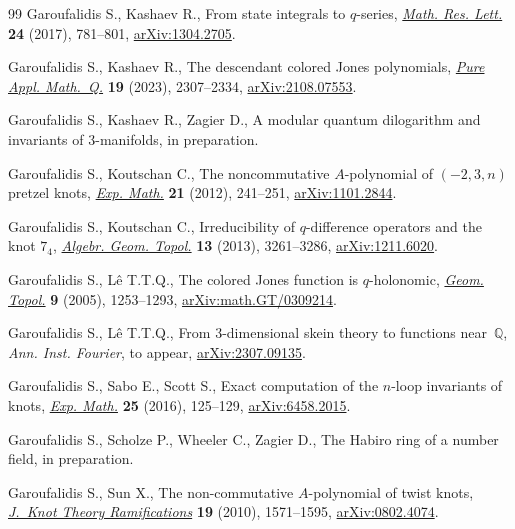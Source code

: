 \documentclass[pdftex]{sigma}
\numberwithin{equation}{section}
\begin{document}
\begin{thebibliography}{99}
Garoufalidis S., Kashaev R., From state integrals to {$q$}-series,
 \href{https://doi.org/10.4310/MRL.2017.v24.n3.a8}{\textit{Math. Res. Lett.}} \textbf{24} (2017), 781--801, \href{https://arxiv.org/abs/1304.2705}{arXiv:1304.2705}.

Garoufalidis S., Kashaev R., The descendant colored {J}ones polynomials,
 \href{https://doi.org/10.4310/PAMQ.2023.v19.n5.a2}{\textit{Pure Appl. Math.~Q.}} \textbf{19} (2023), 2307--2334,
 \href{https://arxiv.org/abs/2108.07553}{arXiv:2108.07553}.

Garoufalidis S., Kashaev R., Zagier D., A modular quantum dilogarithm and
 invariants of {3}-manifolds, in preparation.

Garoufalidis S., Koutschan C., The noncommutative {$A$}-polynomial of
 {$(-2,3,n)$} pretzel knots, \href{https://doi.org/10.1080/10586458.2012.651409}{\textit{Exp. Math.}} \textbf{21} (2012), 241--251,
 \href{https://arxiv.org/abs/1101.2844}{arXiv:1101.2844}.

Garoufalidis S., Koutschan C., Irreducibility of {$q$}-difference operators and
 the knot {$7_4$}, \href{https://doi.org/10.2140/agt.2013.13.3261}{\textit{Algebr. Geom. Topol.}} \textbf{13} (2013),
 3261--3286, \href{https://arxiv.org/abs/1211.6020}{arXiv:1211.6020}.

Garoufalidis S., L\^e T.T.Q., The colored {J}ones function is {$q$}-holonomic,
 \href{https://doi.org/10.2140/gt.2005.9.1253}{\textit{Geom. Topol.}} \textbf{9} (2005), 1253--1293,
 \href{https://arxiv.org/abs/math.GT/0309214}{arXiv:math.GT/0309214}.

Garoufalidis S., L\^e T.T.Q., From 3-dimensional skein theory to functions
 near~{$\mathbb{Q}$}, \textit{Ann. Inst. Fourier}, {t}o appear,
 \href{https://arxiv.org/abs/2307.09135}{arXiv:2307.09135}.

Garoufalidis S., Sabo E., Scott S., Exact computation of the {$n$}-loop
 invariants of knots, \href{https://doi.org/10.1080/10586458.2015.1048012}{\textit{Exp. Math.}} \textbf{25} (2016), 125--129,
 \href{https://arxiv.org/abs/6458.2015}{arXiv:6458.2015}.

Garoufalidis S., Scholze P., Wheeler C., Zagier D., The {H}abiro ring of a
 number field, in preparation.

Garoufalidis S., Sun X., The non-commutative {$A$}-polynomial of twist knots,
 \href{https://doi.org/10.1142/S021821651000856X}{\textit{J.~Knot Theory Ramifications}} \textbf{19} (2010), 1571--1595,
 \href{https://arxiv.org/abs/0802.4074}{arXiv:0802.4074}.


\end{thebibliography}
\end{document}
